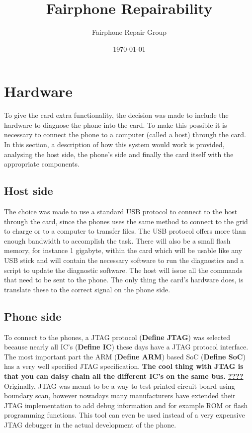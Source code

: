 \documentclass[final,a4paper]{report} %
\author{Fairphone Repair Group}
\title{Fairphone Repairability}
\date{\today}
\begin{document}
\section{Hardware}
\label{sec:scrw-it-hardware}
To give the card extra functionality, the decision was made to include the hardware to diagnose the phone into the card.
To make this possible it is necessary to connect the phone to a computer (called a host) through the card. In this section, a description of how this system would work is provided, analysing the host side, the phone's side and finally the card itself with the appropriate components.

\subsection{Host side}
The choice was made to use a standard USB protocol to connect to the host through the card, since the phones uses the same method to connect to the grid to charge or to a computer to transfer files.
The USB protocol offers more than enough bandwidth to accomplish the task.
There will also be a small flash memory, for instance 1 gigabyte, within the card which will be usable like any USB stick and will contain the necessary software to run the diagnostics and a script to update the diagnostic software.
The host will issue all the commands that need to be sent to the phone. The only thing the card's hardware does, is translate these to the correct signal on the phone side.

\subsection{Phone side}
To connect to the phones, a JTAG protocol (\textbf{Define JTAG}) was selected because nearly all IC's (\textbf{Define IC}) these days have a JTAG protocol interface.
The most important part the ARM (\textbf{Define ARM}) based SoC (\textbf{Define SoC}) has a very well specified JTAG specification.
\textbf{The cool thing with JTAG is that you can daisy chain all the different IC's on the same bus. \underline{????}}
Originally, JTAG was meant to be a way to test printed circuit board using boundary scan, however nowadays many manufacturers have extended their JTAG implementation to add debug information and for example ROM or flash programming functions.
This tool can even be used instead of a very expensive JTAG debugger in the actual development of the phone.
\end{document}
